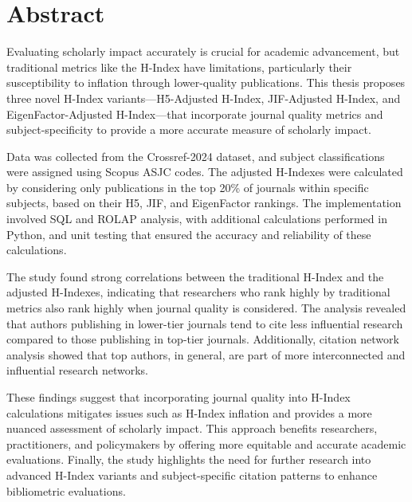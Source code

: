 \chapter*{\centering Abstract}
Evaluating scholarly impact accurately is crucial for academic advancement, but traditional metrics
like the H-Index have limitations, particularly their susceptibility to inflation through
lower-quality publications.  This thesis proposes three novel H-Index variants—H5-Adjusted H-Index,
JIF-Adjusted H-Index, and EigenFactor-Adjusted H-Index—that incorporate journal quality metrics
and subject-specificity to provide a more accurate measure of scholarly impact.

Data was collected from the Crossref-2024 dataset, and subject classifications
were assigned using Scopus ASJC codes. The adjusted H-Indexes were calculated
by considering only publications in the top 20\% of journals within specific
subjects, based on their H5, JIF, and EigenFactor rankings. The implementation
involved SQL and ROLAP analysis, with additional calculations performed in
Python, and unit testing that ensured the accuracy and reliability of these
calculations.

The study found strong correlations between the traditional H-Index and the
adjusted H-Indexes, indicating that researchers who rank highly by traditional
metrics also rank highly when journal quality is considered. The analysis
revealed that authors publishing in lower-tier journals tend to cite less
influential research compared to those publishing in top-tier journals.
Additionally, citation network analysis showed that top authors, in general, are
part of more interconnected and influential research networks.

These findings suggest that incorporating journal quality into H-Index
calculations mitigates issues such as H-Index inflation and provides a more
nuanced assessment of scholarly impact. This approach benefits researchers,
practitioners, and policymakers by offering more equitable and accurate
academic evaluations. Finally, the study highlights the need for further
research into advanced H-Index variants and subject-specific citation patterns
to enhance bibliometric evaluations.

